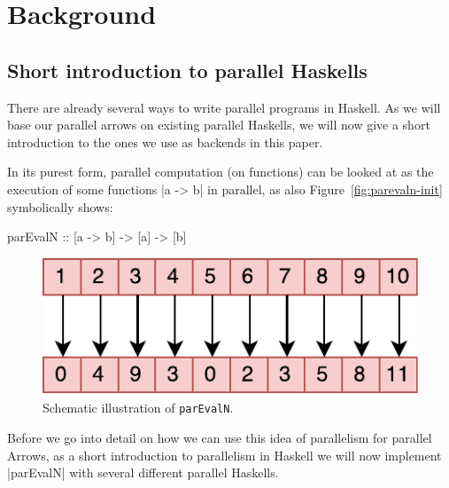 \section{Background}
\label{sec:background}
\subsection{Short introduction to parallel Haskells}
There are already several ways to write parallel programs in Haskell. As we will base our parallel arrows on existing parallel Haskells, we will now give a short introduction to the ones we use as backends in this paper.

In its purest form, parallel computation (on functions) can be looked at as the execution of some functions |a -> b| in parallel, as also Figure~\ref{fig:parevaln-init} symbolically shows:

\begin{code}
parEvalN :: [a -> b] -> [a] -> [b]
\end{code}

\begin{figure}[h]
  \centering
	\includegraphics[scale=0.7]{images/parEvalN}
	\caption{Schematic illustration of \texttt{parEvalN}.}
	\label{fig:parEvalN}
\end{figure}

Before we go into detail on how we can use this idea of parallelism for parallel Arrows, as a short introduction to parallelism in Haskell we will now implement |parEvalN| with several different parallel Haskells.

